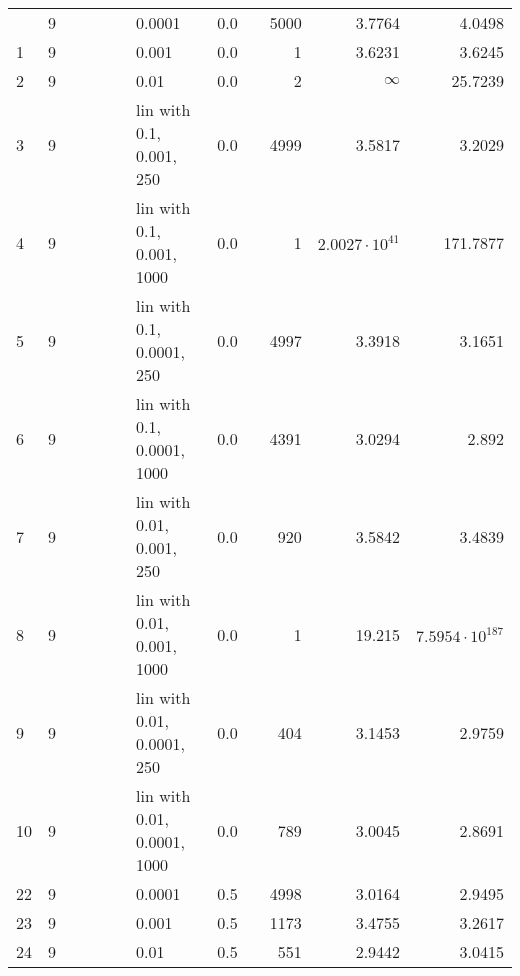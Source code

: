 \begin{longtable}{lrrrrrlrrrrr}
\bottomrule
\endlastfoot
    0 &       9 &   &   &   &   &                      0.0001 &      0.0 &        &    5000 &                 3.7764 &                 4.0498 \\
    1 &       9 &   &   &   &   &                       0.001 &      0.0 &        &       1 &                 3.6231 &                 3.6245 \\
    2 &       9 &   &   &   &   &                        0.01 &      0.0 &        &       2 &               $\infty$ &                25.7239 \\
    3 &       9 &   &   &   &   &    lin with 0.1, 0.001, 250 &      0.0 &        &    4999 &                 3.5817 &                 3.2029 \\
    4 &       9 &   &   &   &   &   lin with 0.1, 0.001, 1000 &      0.0 &        &       1 &  $2.0027\cdot 10^{41}$ &               171.7877 \\
    5 &       9 &   &   &   &   &   lin with 0.1, 0.0001, 250 &      0.0 &        &    4997 &                 3.3918 &                 3.1651 \\
    6 &       9 &   &   &   &   &  lin with 0.1, 0.0001, 1000 &      0.0 &        &    4391 &                 3.0294 &                  2.892 \\
    7 &       9 &   &   &   &   &   lin with 0.01, 0.001, 250 &      0.0 &        &     920 &                 3.5842 &                 3.4839 \\
    8 &       9 &   &   &   &   &  lin with 0.01, 0.001, 1000 &      0.0 &        &       1 &                 19.215 & $7.5954\cdot 10^{187}$ \\
    9 &       9 &   &   &   &   &  lin with 0.01, 0.0001, 250 &      0.0 &        &     404 &                 3.1453 &                 2.9759 \\
   10 &       9 &   &   &   &   & lin with 0.01, 0.0001, 1000 &      0.0 &        &     789 &                 3.0045 &                 2.8691 \\
   22 &       9 &   &   &   &   &                      0.0001 &      0.5 &        &    4998 &                 3.0164 &                 2.9495 \\
   23 &       9 &   &   &   &   &                       0.001 &      0.5 &        &    1173 &                 3.4755 &                 3.2617 \\
   24 &       9 &   &   &   &   &                        0.01 &      0.5 &        &     551 &                 2.9442 &                 3.0415 \\

\end{longtable}
